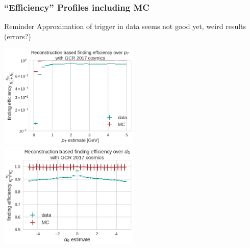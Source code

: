 \documentclass[18pt]{beamer}
\begin{document}
  \begin{frame}
    \frametitle{``Efficiency'' Profiles including MC}
    \begin{alertblock}{Reminder}
      Approximation of trigger in data seems not good yet, weird results (errors?)
    \end{alertblock}
    \begin{center}
      \includegraphics[width=0.5\textwidth]{figures/findeff_pt_data_mc.png}
      \includegraphics[width=0.5\textwidth]{figures/findeff_d0_data_mc.png}
    \end{center}
  \end{frame}
  
\end{document}
